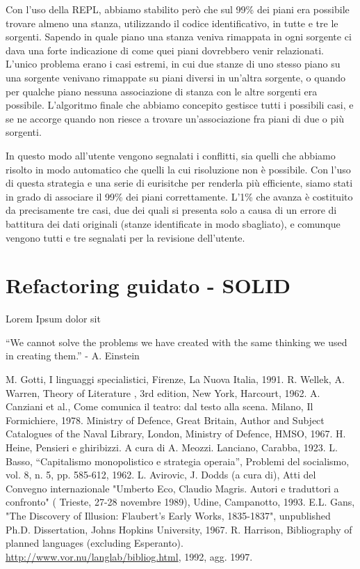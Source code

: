 \documentclass[12pt]{report}
\begin{document}
Con l'uso della REPL, abbiamo stabilito però che sul 99\% dei piani era possibile trovare almeno una stanza, utilizzando il codice identificativo, in tutte e tre le sorgenti. Sapendo in quale piano una stanza veniva rimappata in ogni sorgente ci dava una forte indicazione di come quei piani dovrebbero venir relazionati. L'unico problema erano i casi estremi, in cui due stanze di uno stesso piano su una sorgente venivano rimappate su piani diversi in un'altra sorgente, o quando per qualche piano nessuna associazione di stanza con le altre sorgenti era possibile. L'algoritmo finale che abbiamo concepito gestisce tutti i possibili casi, e se ne accorge quando non riesce a trovare un'associazione fra piani di due o più sorgenti. 

In questo modo all'utente vengono segnalati i conflitti, sia quelli che abbiamo risolto in modo automatico che quelli la cui risoluzione non è possibile. Con l'uso di questa strategia e una serie di eurisitche per renderla più efficiente, siamo stati in grado di associare il 99\% dei piani correttamente. L'1\% che avanza è costituito da precisamente tre casi, due dei quali si presenta solo a causa di un errore di battitura dei dati originali (stanze identificate in modo sbagliato), e comunque vengono tutti e tre segnalati per la revisione dell'utente. 


% 
% 
\section{Refactoring guidato - SOLID}
Lorem Ipsum dolor sit


``We cannot solve the problems we have created
with the same thinking we used in creating them.'' - A. Einstein


%
%

%
%
\begin{thebibliography}{00}
%
M. Gotti, I linguaggi specialistici, Firenze, La Nuova Italia, 1991.
%
R. Wellek, A. Warren, Theory of Literature , 3rd edition, New York, Harcourt, 1962.
%
A. Canziani et al., Come comunica il teatro: dal testo alla scena. Milano, Il Formichiere, 1978.
%
Ministry of Defence, Great Britain, Author and Subject Catalogues of the Naval Library, London, Ministry of Defence, HMSO, 1967.
%
H. Heine, Pensieri e ghiribizzi. A cura di A. Meozzi. Lanciano, Carabba, 1923.
%
L. Basso, ``Capitalismo monopolistico e strategia operaia'', Problemi del socialismo, vol. 8, n. 5, pp. 585-612, 1962.
%
L. Avirovic, J. Dodds (a cura di), Atti del Convegno internazionale "Umberto Eco, Claudio Magris. Autori e traduttori a confronto" ( Trieste, 27-28 novembre 1989), Udine, Campanotto, 1993.
%
E.L. Gans, "The Discovery of Illusion: Flaubert's Early Works, 1835-1837", unpublished Ph.D. Dissertation, Johns Hopkins University, 1967.
%
R. Harrison, Bibliography of planned languages (excluding Esperanto).  \url{http://www.vor.nu/langlab/bibliog.html}, 1992, agg. 1997.
%
\end{thebibliography}
% 
\end{document}
